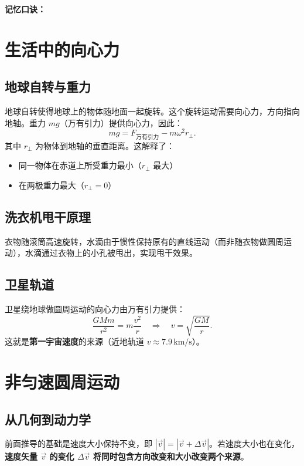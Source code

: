 \documentclass[12pt,a4paper]{article}
\begin{document}
\textbf{记忆口诀：}
\begin{center}
\end{center}

\section{生活中的向心力}

\subsection{地球自转与重力}

地球自转使得地球上的物体随地面一起旋转。这个旋转运动需要向心力，方向指向地轴。重力 $mg$（万有引力）提供向心力，因此：
\[
mg = F_{\text{万有引力}} - m\omega^2 r_{\perp}.
\]
其中 $r_{\perp}$ 为物体到地轴的垂直距离。这解释了：
\begin{itemize}
\item 同一物体在赤道上所受重力最小（$r_{\perp}$ 最大）
\item 在两极重力最大（$r_{\perp}=0$）
\end{itemize}

\subsection{洗衣机甩干原理}

衣物随滚筒高速旋转，水滴由于惯性保持原有的直线运动（而非随衣物做圆周运动），水滴通过衣物上的小孔被甩出，实现甩干效果。

\subsection{卫星轨道}

卫星绕地球做圆周运动的向心力由万有引力提供：
\[
\frac{GMm}{r^2} = m\frac{v^2}{r}
\quad\Longrightarrow\quad
v = \sqrt{\frac{GM}{r}}.
\]
这就是\textbf{第一宇宙速度}的来源（近地轨道 $v\approx 7.9\,\text{km/s}$）。

\section{非匀速圆周运动}

\subsection{从几何到动力学}

前面推导的基础是速度大小保持不变，即 $|\vec{v}|=|\vec{v}+\Delta\vec{v}|$。若速度大小也在变化，\textbf{速度矢量 $\vec{v}$ 的变化 $\Delta\vec{v}$ 将同时包含方向改变和大小改变两个来源}。
\end{document}
